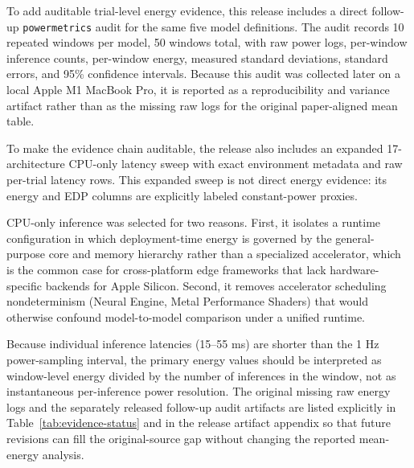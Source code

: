 \documentclass[conference]{IEEEtran}
\begin{document}
To add auditable trial-level energy evidence, this release includes a direct
follow-up \texttt{powermetrics} audit for the same five model definitions. The
audit records 10 repeated windows per model, 50 windows total, with raw power
logs, per-window inference counts, per-window energy, measured standard
deviations, standard errors, and 95\% confidence intervals. Because this audit
was collected later on a local Apple M1 MacBook Pro, it is reported as a
reproducibility and variance artifact rather than as the missing raw logs for
the original paper-aligned mean table.

To make the evidence chain auditable, the release also includes an expanded
17-architecture CPU-only latency sweep with exact environment metadata and raw
per-trial latency rows. This expanded sweep is not direct energy evidence:
its energy and EDP columns are explicitly labeled constant-power proxies.

CPU-only inference was selected for two reasons. First, it isolates a runtime
configuration in which deployment-time energy is governed by the general-purpose
core and memory hierarchy rather than a specialized accelerator, which is the
common case for cross-platform edge frameworks that lack hardware-specific
backends for Apple Silicon. Second, it removes accelerator scheduling
nondeterminism (Neural Engine, Metal Performance Shaders) that would otherwise
confound model-to-model comparison under a unified runtime.

Because individual inference latencies (15--55 ms) are shorter than the 1 Hz
power-sampling interval, the primary energy values should be interpreted as
window-level energy divided by the number of inferences in the window, not as
instantaneous per-inference power resolution. The original missing raw energy
logs and the separately released follow-up audit artifacts are listed
explicitly in Table~\ref{tab:evidence-status} and in the release artifact
appendix so that future revisions can fill the original-source gap without
changing the reported mean-energy analysis.
\end{document}
